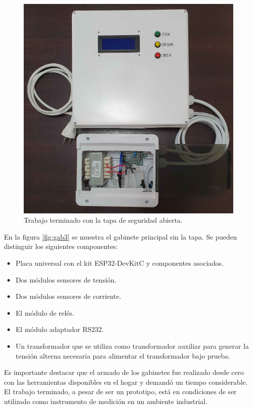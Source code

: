 \begin{figure}[h]
	\centering
	\includegraphics[scale=0.16]{./Figures/gab2.jpg}
	\caption{Trabajo terminado con la tapa de seguridad abierta.}
	\label{fig:gab2}
\end{figure}

\pagebreak

En la figura \ref{fig:gab3} se muestra el gabinete principal sin la tapa. Se pueden distinguir los siguientes componentes:

\begin{itemize}
\item Placa universal con el kit ESP32-DevKitC y componentes asociados.
\item Dos módulos sensores de tensión.
\item Dos módulos sensores de corriente.
\item El módulo de relés.
\item El módulo adaptador RS232.
\item Un transformador que se utiliza como transformador auxiliar para generar la tensión alterna necesaria para alimentar el transformador bajo prueba.
\end{itemize}

Es importante destacar que el armado de los gabinetes fue realizado desde cero con las herramientas disponibles en el hogar y demandó un tiempo considerable. El trabajo terminado, a pesar de ser un prototipo, está en condiciones de ser utilizado como instrumento de medición en un ambiente industrial.

